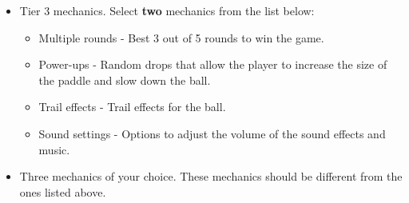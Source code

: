 \documentclass{article}
\begin{document}
\begin{itemize}
    \item Tier 3 mechanics. Select \textbf{two} mechanics from the list below:
    \begin{itemize}
        \item Multiple rounds - Best 3 out of 5 rounds to win the game.
        \item Power-ups - Random drops that allow the player to increase the size of the paddle and slow down the ball.
        \item Trail effects - Trail effects for the ball.
        \item Sound settings - Options to adjust the volume of the sound effects and music.
    \end{itemize}
    \item Three mechanics of your choice. These mechanics should be different from the ones listed above. 
\end{itemize}
\end{document}
